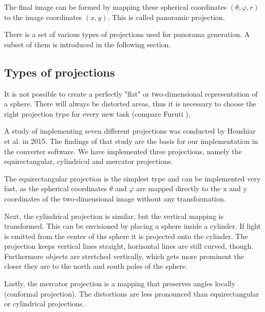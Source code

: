 The final image can be formed by mapping these spherical coordinates {$(\theta, \varphi, r)$} to the image coordinates {$(x, y)$}. This is called panoramic projection.

There is a set of various types of projections used for panorama generation. A subset of them is introduced in the following section.

\subsection{Types of projections} \label{section_types_of_projections}

It is not possible to create a perfectly "flat" or two-dimensional representation of a sphere. There will always be distorted areas, thus it is necessary to choose the right projection type for every new task (compare Furuti \parencite{panoramaProblem} ).

A study of implementing seven different projections was conducted by Houshiar et al. \parencite{houshiar2015a} in 2015. The findings of that study are the basis for our implementation in the converter software. We have implemented three projections, namely the equirectangular, cylindrical and mercator projections.

The equirectangular projection is the simplest type and can be implemented very fast, as the spherical coordinates {$\theta$} and {$\varphi$} are mapped directly to the x and y coordinates of the two-dimensional image without any transformation.

Next, the cylindrical projection is similar, but the vertical mapping is transformed. This can be envisioned by placing a sphere inside a cylinder. If light is emitted from the center of the sphere it is projected onto the cylinder. The projection keeps vertical lines straight, horizontal lines are still curved, though. Furthermore objects are stretched vertically, which gets more prominent the closer they are to the north and south poles of the sphere.

Lastly, the mercator projection is a mapping that preserves angles locally (conformal projection). The distortions are less pronounced than equirectangular or cylindrical projections.

